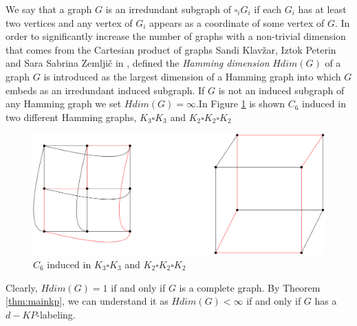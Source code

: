 \documentclass[12pt,a4paper,titlepage,openany]{report}
\begin{document}
We say that a graph $G$ is an irredundant subgraph of $\square _iG_i$ if each $G_i$ has at least two vertices and any vertex of $G_i$ appears as a coordinate of some vertex of $G$.\newline
In order to significantly increase the number of graphs with a non-trivial dimension that comes from the Cartesian product of graphs Sandi Klav\v zar, Iztok Peterin and Sara Sabrina Zemlji\v c in \cite{Sandi}, defined the \textit{Hamming dimension} $Hdim(G )$ of a graph $G$ is introduced as the largest dimension of a Hamming graph into which $G$ embeds as an irredundant induced subgraph. If $G$ is not an induced subgraph of any Hamming graph we set $Hdim ( G ) = \infty$.\newline In Figure \ref{fig:c6hdim} is shown $C_6$ induced in two different Hamming graphs, $K_3\square K_3$ and $K_2\square K_2\square K_2$
\begin{figure}[h]
\begin{center}
\includegraphics[width=1\linewidth]{figures/c_6hdim.png}
\end{center}
\caption{$C_6$ induced in $K_3\square K_3$ and $K_2\square K_2\square K_2$}\label{fig:c6hdim}
\end{figure}
Clearly, $Hdim ( G ) = 1$ if and only if $G$ is a complete graph. By Theorem \ref{thm:mainkp}, we can understand it as $Hdim ( G ) <\infty$ if and only if $G$ has a $d-KP$-labeling.
\end{document}
